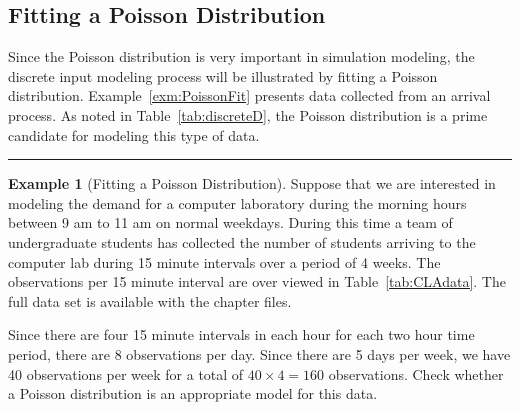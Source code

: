 \documentclass[
]{book}
\theoremstyle{definition}
\theoremstyle{definition}
\newtheorem{example}{Example}[chapter]
\theoremstyle{definition}
\theoremstyle{definition}
\theoremstyle{remark}
\begin{document}
\hypertarget{AppDisFit:PoissonFit}{%
\subsection{Fitting a Poisson Distribution}\label{AppDisFit:PoissonFit}}

Since the Poisson distribution is very important in simulation modeling,
the discrete input modeling process will be illustrated by fitting a
Poisson distribution.
Example~\ref{exm:PoissonFit} presents data collected from an arrival
process. As noted in Table~\ref{tab:discreteD}, the Poisson distribution is a prime candidate
for modeling this type of data.

\begin{center}\rule{0.5\linewidth}{0.5pt}\end{center}

\begin{example}[Fitting a Poisson Distribution]
\protect\hypertarget{exm:PoissonFit}{}{\label{exm:PoissonFit} {} }Suppose that we are interested in modeling the demand for a computer laboratory
during the morning hours between 9 am to 11 am on normal weekdays.
During this time a team of undergraduate students has collected the
number of students arriving to the computer lab during 15 minute
intervals over a period of 4 weeks. The observations per 15 minute
interval are over viewed in Table~\ref{tab:CLAdata}.
The full data set is available with the chapter files.

Since there are four 15 minute intervals in each hour for each two hour
time period, there are 8 observations per day. Since there are 5 days
per week, we have 40 observations per week for a total of
\(40\times 4= 160\) observations. Check whether a Poisson distribution is
an appropriate model for this data.
\end{example}
\end{document}
